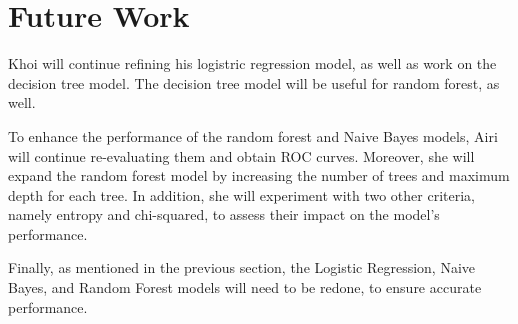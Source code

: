 \section{Future Work}

Khoi will continue refining his logistric regression model, as well as work on the decision tree model. The decision tree model will be useful for random forest, as well.

To enhance the performance of the random forest and Naive Bayes models, Airi will continue re-evaluating them and obtain ROC curves. Moreover, she will expand the random forest model by increasing the number of trees and maximum depth for each tree. In addition, she will experiment with two other criteria, namely entropy and chi-squared, to assess their impact on the model's performance.

Finally, as mentioned in the previous section, the Logistic Regression, Naive Bayes, and Random Forest models will need to be redone, to ensure accurate performance.